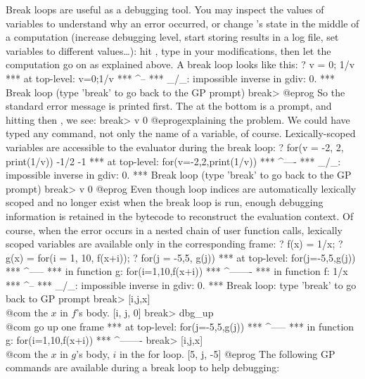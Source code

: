 Break loops are useful as a debugging tool. You may inspect the values of
 variables to understand why an error occurred, or change
's state in the middle of a computation (increase debugging level,
start storing results in a log file, set variables to different values\dots):
hit , type in your modifications, then let the computation go on as
explained above. A break loop looks like this:
\bprog
? v = 0; 1/v
  ***   at top-level: v=0;1/v
  ***                      ^--
  *** _/_: impossible inverse in gdiv: 0.
  ***   Break loop (type 'break' to go back to the GP prompt)
break>
@eprog
\noindent So the standard error message is printed first. The
 at the bottom is a prompt, and hitting  then
, we see:
\bprog
break> v
0
@eprog\noindent explaining the problem. We could have typed any 
command, not only the name of a variable, of course. Lexically-scoped
variables are accessible to the evaluator during the break loop:
\bprog
? for(v = -2, 2, print(1/v))
-1/2
-1
  ***   at top-level: for(v=-2,2,print(1/v))
  ***                                   ^----
  *** _/_: impossible inverse in gdiv: 0.
  ***   Break loop (type 'break' to go back to the GP prompt)
break> v
0
@eprog\noindent
Even though loop indices are automatically lexically scoped and no longer
exist when the break loop is run, enough debugging information is retained in
the bytecode to reconstruct the evaluation context. Of course, when the error
occurs in a nested chain of user function calls, lexically scoped variables are
available only in the corresponding frame:
\bprog
? f(x) = 1/x;
? g(x) = for(i = 1, 10, f(x+i));
? for(j = -5,5, g(j))
  ***   at top-level: for(j=-5,5,g(j))
  ***                            ^-----
  ***   in function g: for(i=1,10,f(x+i))
  ***                             ^-------
  ***   in function f: 1/x
  ***                   ^--
  *** _/_: impossible inverse in gdiv: 0.
  ***   Break loop: type 'break' to go back to GP prompt
break> [i,j,x]     \\ @com the $x$ in $f$'s body.
[i, j, 0]
break> dbg_up      \\ @com go up one frame
  ***   at top-level: for(j=-5,5,g(j))
  ***                            ^-----
  ***   in function g: for(i=1,10,f(x+i))
  ***                             ^-------
break> [i,j,x]      \\ @com the $x$ in $g$'s body, $i$ in the for loop.
[5, j, -5]
@eprog
The following GP commands are available during a break loop to help debugging:

